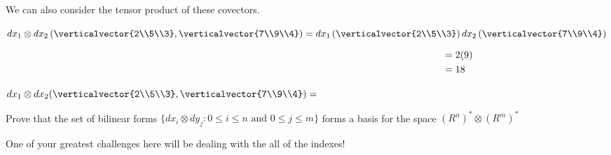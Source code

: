\documentclass{ximera}
\begin{document}
\begin{question}
  We can also consider the tensor product of these covectors.
  \begin{solution}
    \begin{hint}
      $dx_1 \otimes dx_2 \left(\verticalvector{2\\5\\3},\verticalvector{7\\9\\4}\right) = dx_1\left(\verticalvector{2\\5\\3}\right)dx_2\left(\verticalvector{7\\9\\4}\right)$
    \end{hint}
    \begin{hint}
      \begin{align*}
        \hphantom{dx_1 \otimes dx_2 \left(\verticalvector{2\\5\\3},\verticalvector{7\\9\\4}\right)} &= 2(9)\\
        &= 18 
      \end{align*}
    \end{hint}
    $dx_1 \otimes dx_2 (\verticalvector{2\\5\\3},\verticalvector{7\\9\\4}) = $
  \end{solution}
\end{question}

Prove that the set of bilinear forms $\{ dx_i \otimes dy_j : 0 \leq i \leq n \text{ and } 0\leq j \leq m\}$ forms a basis for the space 
$\left(R^n\right)^* \otimes \left(R^m\right)^*$ 
\begin{warning}
  One of your greatest challenges here will be dealing with the all of the indexes!
\end{warning}
	
\end{document}
